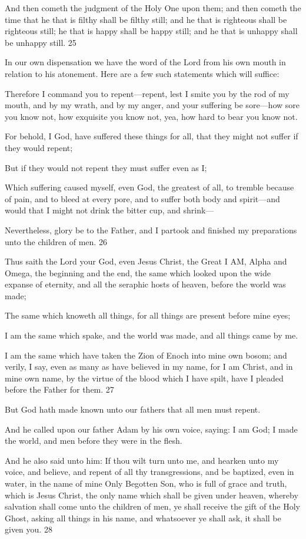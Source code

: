 And then cometh the judgment of the Holy One upon them; and then cometh the time that he
that is filthy shall be filthy still; and he that is righteous shall be righteous still; he that is
happy shall be happy still; and he that is unhappy shall be unhappy still. 25

In our own dispensation we have the word of the Lord from his own mouth in relation to his
atonement. Here are a few such statements which will suffice:

Therefore I command you to repent—repent, lest I smite you by the rod of my mouth, and by
my wrath, and by my anger, and your suffering be sore—how sore you know not, how
exquisite you know not, yea, how hard to bear you know not.

For behold, I God, have suffered these things for all, that they might not suffer if they would
repent;

But if they would not repent they must suffer even as I;

Which suffering caused myself, even God, the greatest of all, to tremble because of pain, and
to bleed at every pore, and to suffer both body and spirit—and would that I might not drink
the bitter cup, and shrink—

Nevertheless, glory be to the Father, and I partook and finished my preparations unto the
children of men. 26

Thus saith the Lord your God, even Jesus Christ, the Great I AM, Alpha and Omega, the
beginning and the end, the same which looked upon the wide expanse of eternity, and all the
seraphic hosts of heaven, before the world was made;

The same which knoweth all things, for all things are present before mine eyes;

I am the same which spake, and the world was made, and all things came by me.

I am the same which have taken the Zion of Enoch into mine own bosom; and verily, I say,
even as many as have believed in my name, for I am Christ, and in mine own name, by the
virtue of the blood which I have spilt, have I pleaded before the Father for them. 27

But God hath made known unto our fathers that all men must repent.

And he called upon our father Adam by his own voice, saying: I am God; I made the world,
and men before they were in the flesh.

And he also said unto him: If thou wilt turn unto me, and hearken unto my voice, and
believe, and repent of all thy transgressions, and be baptized, even in water, in the name of
mine Only Begotten Son, who is full of grace and truth, which is Jesus Christ, the only name
which shall be given under heaven, whereby salvation shall come unto the children of men,
ye shall receive the gift of the Holy Ghost, asking all things in his name, and whatsoever ye
shall ask, it shall be given you. 28

